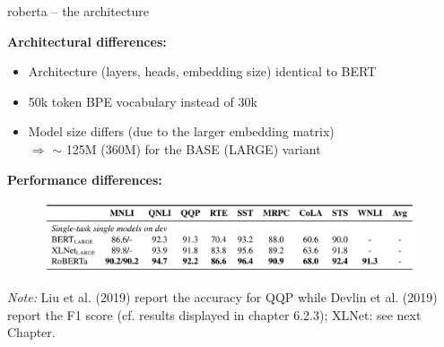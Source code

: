 \begin{frame}{roberta -- the architecture}

\textbf{Architectural differences:}

\begin{itemize}
\item Architecture (layers, heads, embedding size) identical to BERT
\item 50k token BPE vocabulary instead of 30k
\item Model size differs (due to the larger embedding matrix)\\
			$\Rightarrow$ $\sim$ 125M (360M) for the BASE (LARGE) variant 
\end{itemize}

\textbf{Performance differences:}

\begin{figure}
\centering
\includegraphics[width = 11cm]{figure/52-roberta-sota.png}\\ 
\end{figure}

\vfill

\scriptsize
\textit{Note:} Liu et al. (2019) report the accuracy for QQP while Devlin et al. (2019) report the F1 score (cf. results displayed in chapter 6.2.3); XLNet: see next Chapter.

\end{frame}


